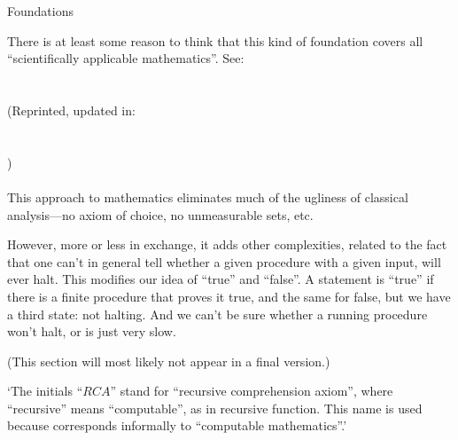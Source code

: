 \documentclass[12pt]{PalisadesLakesBook}
\begin{document}
\begin{plSection}{Foundations}
\begin{itemize}
There is at least some reason to think 
that this kind of foundation covers all ``scientifically
applicable mathematics''.
See:\\
\\
\\
(Reprinted, updated in:\\
\\
\\
)\\
\\

This approach to mathematics eliminates much of the ugliness
of classical analysis---no axiom of choice, no unmeasurable
sets, etc.

However, more or less in exchange, it adds other complexities,
related to the fact that one can't in general tell whether a given
procedure with a given input, will ever halt.
This modifies our idea of ``true'' and ``false''.
A statement is ``true'' if there is a finite procedure that
proves it true, and the same for false,
but we have a third state: not halting. 
And we can't be sure whether a running procedure won't halt,
or is just very slow.

\end{itemize}

\begin{plSection}{\texorpdfstring{}{RCA0}}

(This section will most likely not appear in a final version.)

  `The initials ``${RCA}$'' stand for ``recursive comprehension axiom'',
  where ``recursive'' means ``computable'',
  as in recursive function.
  This name is used because 
  corresponds informally to ``computable mathematics''.'~\cite{wiki:ReverseMathematics}


\end{plSection}
\end{plSection}
\end{document}

